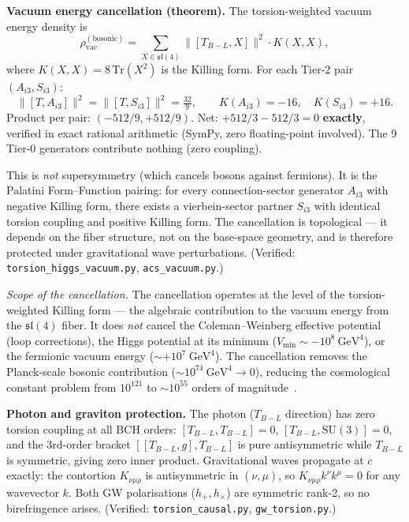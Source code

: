 \documentclass[11pt,a4paper]{article}
\theoremstyle{plain}
\theoremstyle{definition}
\theoremstyle{remark}
\begin{document}
\medskip
\noindent
\textbf{Vacuum energy cancellation (theorem).}
The torsion-weighted vacuum energy density is
\[
  \rho_{\mathrm{vac}}^{(\mathrm{bosonic})}
  = \sum_{X \in \mathfrak{sl}(4)} \|[T_{B{-}L}, X]\|^2 \cdot K(X,X),
\]
where $K(X,X) = 8\,\mathrm{Tr}(X^2)$ is the Killing form.
For each Tier-2 pair $(A_{i3}, S_{i3})$:
\[
  \|[T, A_{i3}]\|^2 = \|[T, S_{i3}]\|^2 = \tfrac{32}{9}, \qquad
  K(A_{i3}) = -16, \quad K(S_{i3}) = +16.
\]
Product per pair: $(-512/9, +512/9)$.
Net: $+512/3 - 512/3 = 0$ \textbf{exactly}, verified in
exact rational arithmetic (SymPy, zero floating-point involved).
The 9 Tier-0 generators contribute nothing (zero coupling).

This is \emph{not} supersymmetry (which cancels bosons against fermions).
It is the Palatini Form--Function pairing: for every connection-sector
generator $A_{i3}$ with negative Killing form, there exists a
vierbein-sector partner $S_{i3}$ with identical torsion coupling and
positive Killing form.  The cancellation is topological --- it depends
on the fiber structure, not on the base-space geometry, and is therefore
protected under gravitational wave perturbations.
(Verified: \texttt{torsion\_higgs\_vacuum.py}, \texttt{acs\_vacuum.py}.)

\textit{Scope of the cancellation.}
The cancellation operates at the level of the torsion-weighted Killing form
--- the algebraic contribution to the vacuum energy from the
$\mathfrak{sl}(4)$ fiber.  It does \emph{not} cancel the
Coleman--Weinberg effective potential (loop corrections), the Higgs
potential at its minimum ($V_{\mathrm{min}} \sim -10^8~\mathrm{GeV}^4$),
or the fermionic vacuum energy ($\sim +10^7~\mathrm{GeV}^4$).
The cancellation removes the Planck-scale bosonic contribution
($\sim 10^{74}~\mathrm{GeV}^4 \to 0$), reducing the cosmological
constant problem from $10^{121}$ to $\sim 10^{55}$ orders of
magnitude~\cite{Hehl1976}.

\medskip
\noindent
\textbf{Photon and graviton protection.}
The photon ($T_{B{-}L}$ direction) has zero torsion coupling at
all BCH orders: $[T_{B{-}L}, T_{B{-}L}] = 0$,
$[T_{B{-}L}, \mathrm{SU}(3)] = 0$, and the 3rd-order bracket
$[[T_{B{-}L}, g], T_{B{-}L}]$ is pure antisymmetric while
$T_{B{-}L}$ is symmetric, giving zero inner product.
Gravitational waves propagate at $c$ exactly:
the contortion $K_{\nu\mu\rho}$ is antisymmetric in $(\nu,\mu)$,
so $K_{\nu\mu\rho} k^\nu k^\mu = 0$ for any wavevector $k$.
Both GW polarisations ($h_+, h_\times$) are symmetric rank-2,
so no birefringence arises.
(Verified: \texttt{torsion\_causal.py}, \texttt{gw\_torsion.py}.)
\end{document}
